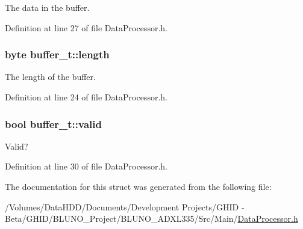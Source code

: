 \-The data in the buffer. 



\-Definition at line 27 of file \-Data\-Processor.\-h.

\hypertarget{structbuffer__t_a5f6ea3ee1957ac885233051495e45596}{
\subsubsection[{length}]{\setlength{\rightskip}{0pt plus 5cm}byte {\bf buffer\-\_\-t\-::length}}}\label{structbuffer__t_a5f6ea3ee1957ac885233051495e45596}


\-The length of the buffer. 



\-Definition at line 24 of file \-Data\-Processor.\-h.

\hypertarget{structbuffer__t_ab8c6d50976afb6e0717a0dc6e6bde41c}{
\subsubsection[{valid}]{\setlength{\rightskip}{0pt plus 5cm}bool {\bf buffer\-\_\-t\-::valid}}}\label{structbuffer__t_ab8c6d50976afb6e0717a0dc6e6bde41c}


\-Valid? 



\-Definition at line 30 of file \-Data\-Processor.\-h.



\-The documentation for this struct was generated from the following file\-:\begin{DoxyCompactItemize}
\item 
/\-Volumes/\-Data\-H\-D\-D/\-Documents/\-Development Projects/\-G\-H\-I\-D -\/ Beta/\-G\-H\-I\-D/\-B\-L\-U\-N\-O\-\_\-\-Project/\-B\-L\-U\-N\-O\-\_\-\-A\-D\-X\-L335/\-Src/\-Main/\hyperlink{_data_processor_8h}{\-Data\-Processor.\-h}\end{DoxyCompactItemize}

